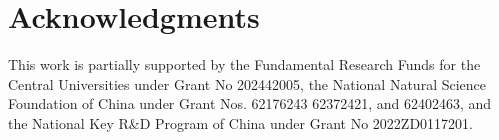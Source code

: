 \section*{Acknowledgments}
This work is partially supported by the Fundamental Research Funds for the Central Universities under Grant No 202442005, the National Natural Science Foundation of China under Grant Nos. 62176243 62372421, and 62402463, and the National Key R\&D Program of China under Grant No 2022ZD0117201. 